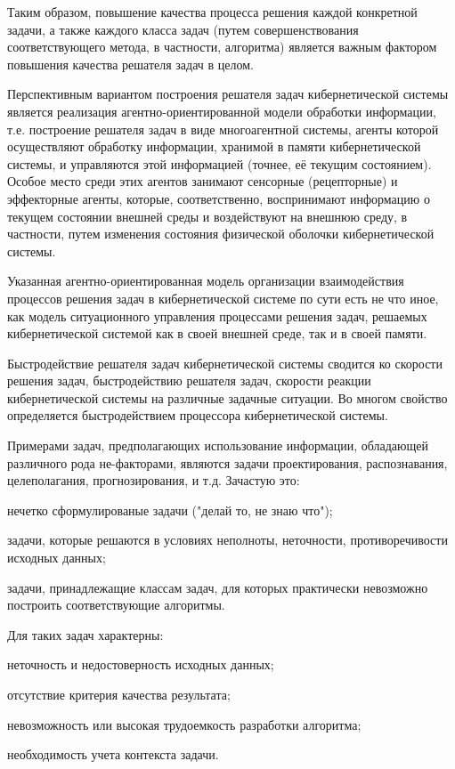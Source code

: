 Таким образом, повышение качества процесса решения каждой конкретной задачи, а также каждого класса задач (путем совершенствования соответствующего метода, в частности, алгоритма) является важным фактором повышения качества решателя задач в целом.

Перспективным вариантом построения решателя задач кибернетической системы является реализация агентно-ориентированной модели обработки информации, т.е. построение решателя задач в виде многоагентной системы, агенты которой осуществляют обработку информации, хранимой в памяти кибернетической системы, и управляются этой информацией (точнее, её текущим состоянием). 
Особое место среди этих агентов занимают сенсорные (рецепторные) и эффекторные агенты, которые, соответственно, воспринимают информацию о текущем состоянии внешней среды и воздействуют на внешнюю среду, в частности, путем изменения состояния физической оболочки кибернетической системы.

Указанная агентно-ориентированная модель организации взаимодействия процессов решения задач в кибернетической системе по сути есть не что иное, как модель ситуационного управления процессами решения задач, решаемых кибернетической системой как в своей внешней среде, так и в своей памяти.

Быстродействие решателя задач кибернетической системы сводится ко скорости решения задач, быстродействию решателя задач, скорости реакции кибернетической системы на различные задачные ситуации.
Во многом свойство определяется быстродействием процессора кибернетической системы.

Примерами задач, предполагающих использование информации, обладающей различного рода не-факторами, являются задачи проектирования, распознавания, целеполагания, прогнозирования, и т.д. Зачастую это:
\begin{textitemize}
    \item нечетко сформулированые задачи ("делай то, не знаю что");
    \item задачи, которые решаются в условиях неполноты, неточности, противоречивости исходных данных;
    \item задачи, принадлежащие классам задач, для которых практически невозможно построить соответствующие алгоритмы.
\end{textitemize}
Для таких задач характерны:
\begin{textitemize}
    \item неточность и недостоверность исходных данных;
    \item отсутствие критерия качества результата;
    \item невозможность или высокая трудоемкость разработки алгоритма;
    \item необходимость учета контекста задачи.
\end{textitemize}

